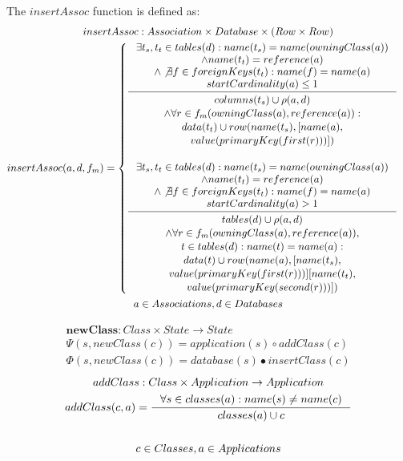 \documentclass[11pt]{article}
\begin{document}
The $insertAssoc$ function is defined as:
\begin{gather*}
insertAssoc : Association \times Database \times (Row \times Row) \\
insertAssoc(a, d, f_m) = \begin{cases}
\inference{ \exists t_s, t_t \in tables(d) : name(t_s) = name(owningClass(a)) \\ \wedge name(t_t) = reference(a) \\ \wedge \not \exists f \in foreignKeys(t_t) : name(f) = name(a) \\ startCardinality(a) \leq 1}{\begin{gathered}
columns(t_s) \cup \rho(a,d) \\ \wedge \forall r \in f_m(owningClass(a), reference(a)) : \\ data(t_t) \cup row(name(t_s), [name(a), \\ value(primaryKey(first(r)))]) 
\end{gathered}
 }
 \\ \\
\inference{ \exists t_s, t_t \in tables(d) : name(t_s) = name(owningClass(a)) \\ \wedge name(t_t) = reference(a) \\ \wedge \not \exists f \in foreignKeys(t_t) : name(f) = name(a) \\ startCardinality(a) > 1}{\begin{gathered} tables(d) \cup
\rho(a,d) \\ \wedge \forall r \in f_m(owningClass(a), reference(a)),\\ t \in tables(d) : name(t) = name(a) : \\ data(t) \cup row(name(a), [name(t_s), \\ value(primaryKey(first(r)))] [name(t_t), \\ value(primaryKey(second(r)))])
\end{gathered}
 } 
 \end{cases}\\
 a \in Associations, d \in Databases
\end{gather*}

\begin{gather*}
\mathbf{newClass} : Class \times State \rightarrow State \\
\Psi(s, newClass(c)) = application(s) \circ addClass(c) \\
\Phi(s, newClass(c)) = database(s) \bullet insertClass(c) 
\end{gather*}
\begin{gather*}
addClass: Class \times Application \rightarrow Application \\ 
addClass(c, a) = \inference{\forall s \in classes(a) : name(s) \neq name(c)}{classes(a) \cup c} \\ \\
c \in Classes, a \in Applications
\end{gather*}
\end{document}
